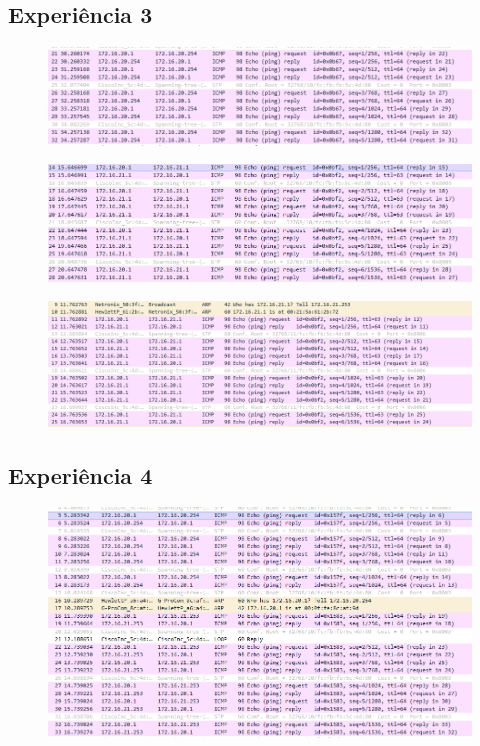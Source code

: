 \documentclass{article}
\begin{document}
\subsection{Experiência 3}
\begin{figure}[H]
\centering
\includegraphics[width=1.0\textwidth]{exp3-1.PNG}
\end{figure}
\begin{figure}[H]
\centering
\includegraphics[width=1.0\textwidth]{exp3-2.PNG}
\end{figure}



\begin{figure}[H]
\centering
\includegraphics[width=1.0\textwidth]{exp3-3.PNG}
\end{figure}

\subsection{Experiência 4}
\begin{figure}[H]
\centering
\includegraphics[width=1.0\textwidth]{exp4-1.PNG}
\end{figure}
\end{document}
